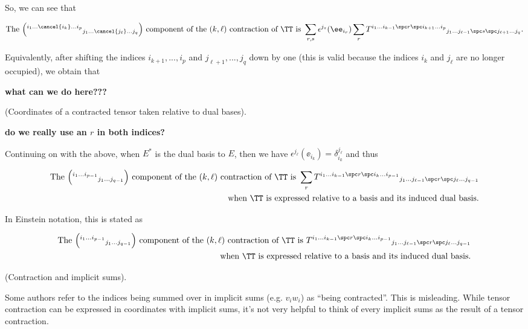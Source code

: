 \begin{deriv}
    So, we can see that
    
    \begin{align*}
        \text{The $\Big( {}^{i_1 ... \cancel{i_k} ... i_p}{}_{j_1 ... \cancel{j_\ell} ... j_q} \Big)$ component of the $(k, \ell)$ contraction of $\TT$ is } \sum_{r, s} \epsilon^{j_s}(\ee_{i_r}) \sum_r T^{i_1 ... i_{k - 1} \spc r \spc i_{k + 1} ... i_p}{}_{j_1 ... j_{\ell - 1} \spc s \spc j_{\ell + 1} ... j_q}.
    \end{align*}

    Equivalently, after shifting the indices $i_{k + 1}, ..., i_p$ and $j_{\ell + 1}, ..., j_q$ down by one (this is valid because the indices $i_k$ and $j_\ell$ are no longer occupied), we obtain that

    \textbf{what can we do here???}
\end{deriv}

\begin{remark}
    (Coordinates of a contracted tensor taken relative to dual bases).

    \textbf{do we really use an $r$ in both indices?}

    Continuing on with the above, when $E^*$ is the dual basis to $E$, then we have $\epsilon^{j_\ell}(\ee_{i_k}) = \delta^{j_\ell}_{i_k}$ and thus
    
    \begin{align*}
        \text{The $\Big( {}^{i_1 ... i_{p - 1}} {}_{j_1 ... j_{q - 1}} \Big)$ component of the $(k, \ell)$ contraction of $\TT$ is } \sum_r T^{i_1 ... i_{k - 1} \spc r \spc i_k ... i_{p - 1}}{}_{j_1 ... j_{\ell - 1} \spc r \spc j_{\ell} ... j_{q - 1}} \\ \text{when $\TT$ is expressed relative to a basis and its induced dual basis}.
    \end{align*}
    
    In Einstein notation, this is stated as
    
    \begin{align*}
        \text{The $\Big( {}^{i_1 ... i_{p - 1}} {}_{j_1 ... j_{q - 1}} \Big)$ component of the $(k, \ell)$ contraction of $\TT$ is } T^{i_1 ... i_{k - 1} \spc r \spc i_k ... i_{p - 1}}{}_{j_1 ... j_{\ell - 1} \spc r \spc j_{\ell} ... j_{q - 1}} \\ \text{when $\TT$ is expressed relative to a basis and its induced dual basis}.
    \end{align*}
\end{remark}

\begin{remark}
    (Contraction and implicit sums).
    
    Some authors refer to the indices being summed over in implicit sums (e.g. $v_i w_i$) as ``being contracted''. This is misleading. While tensor contraction can be expressed in coordinates with implicit sums, it’s not very helpful to think of every implicit sums as the result of a tensor contraction.
\end{remark}

